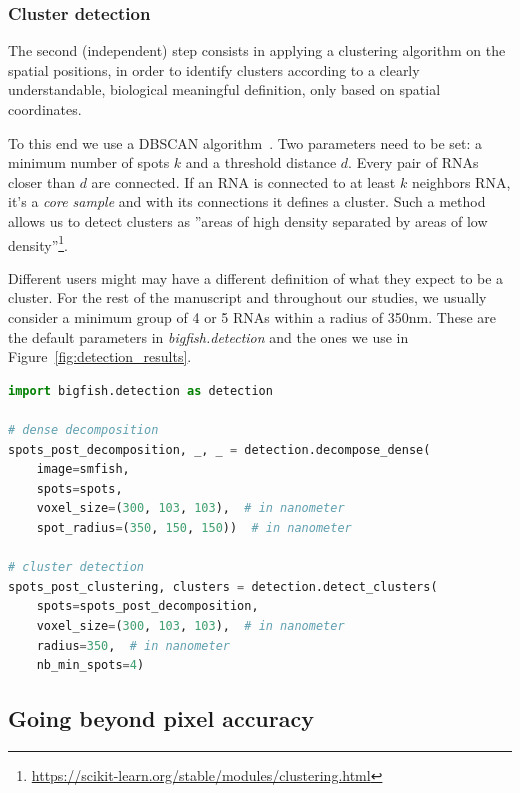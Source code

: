 \subsubsection{Cluster detection}

The second (independent) step consists in applying a clustering algorithm on the spatial positions, in order to identify clusters according to a clearly understandable, biological meaningful definition, only based on spatial coordinates.

To this end we use a DBSCAN algorithm~\cite{ester_density-based_1996, scikit-learn}.
Two parameters need to be set: a minimum number of spots $k$ and a threshold distance $d$.
Every pair of \ac{RNA}s closer than $d$ are connected.
If an \ac{RNA} is connected to at least $k$ neighbors \ac{RNA}, it's a \emph{core sample} and with its connections it defines a cluster.
Such a method allows us to detect clusters as ''areas of high density separated by areas of low density''\footnote{\url{https://scikit-learn.org/stable/modules/clustering.html}}.

Different users might may have a different definition of what they expect to be a cluster.
For the rest of the manuscript and throughout our studies, we usually consider a minimum group of 4 or 5 \ac{RNA}s within a radius of 350nm.
These are the default parameters in \emph{bigfish.detection} and the ones we use in Figure~\ref{fig:detection_results}.\\

\begin{minipage}{0.9\textwidth}
\begin{lstlisting}[language=Python]
import bigfish.detection as detection

# dense decomposition
spots_post_decomposition, _, _ = detection.decompose_dense(
    image=smfish,
    spots=spots,
    voxel_size=(300, 103, 103),  # in nanometer
    spot_radius=(350, 150, 150))  # in nanometer

# cluster detection
spots_post_clustering, clusters = detection.detect_clusters(
    spots=spots_post_decomposition,
    voxel_size=(300, 103, 103),  # in nanometer
    radius=350,  # in nanometer
    nb_min_spots=4)
\end{lstlisting}
\end{minipage}

\subsection{Going beyond pixel accuracy}
\label{subsec:subpixel}

